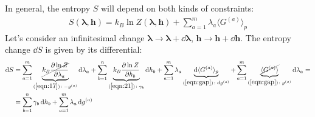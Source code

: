 \documentclass[../../main.tex]{subfiles}
\begin{document}
\begin{comment}
Besides the Lagrange multipliers $\bm{\lambda}$ associated with the constraints (also called \textit{soft constraints}), we can have other (\textit{hard}) constraints, given for example by conservation laws. For instance, variables such as the volume $V$, the number of particles $N$, the magnetization $\bm{M}$, etc. may be \textbf{fixed}. We denote them with a vector $\bm{h}$, and so $S$ depends both on $\bm{\lambda}$ and $\bm{h}$.

Macroscopically, $\bm{\lambda}$ are the conjugate variables of quantities $G^{(a)}$ (\ref{eqn:13a}) that are fixed \textit{on average} (\textbf{first class}), where the $\bm{h}$ correspond to variables that are kept constant \textit{at all times} (\textbf{second class}), which are:
\begin{align} %
    \gamma_b \equiv k_B \pdv{\ln Z}{h^{(b)}}
\end{align} 

In the next section we will consider three examples corresponding to the variables $H$, $N$ and $V$.
\begin{itemize}
    \item \textbf{Microcanonical} ensemble: no variables in the first class, i.e. no constraints of the form (\ref{eqn:13a}). $H, V, N$ belong to the second class.
    \item \textbf{Canonical} ensemble: $G^{(1)} = H$ in the first class, $N$ and $V$ in the second class.
    \item \textbf{Grandcanonical} ensemble: $G^{(1)} = H$ and $G^{(2)} = N$ in the first class, $V$ in the second  
\end{itemize}
\end{comment}

In general, the entropy $S$ will depend on both kinds of constraints:
\begin{align}\label{eqn:22}
    S(\bm{\lambda}, \bm{h}) = k_B \ln Z(\bm{\lambda}, \bm{h}) + \sum_{a=1}^m \lambda_a \langle G^{(a)} \rangle_p
\end{align}
Let's consider an infinitesimal change $\bm{\lambda} \to \bm{\lambda} +\dd{\bm{\lambda}}$, $\bm{h} \to \bm{h} + \dd{\bm{h}}$. The entropy change $\dd{S}$ is given by its differential:
\begin{align}\label{eqn:23}
    \dd{S} &= \sum_{a=1}^m \underbrace{\cancel{k_B \pdv{\ln Z}{\lambda_a}}}_{(\ref{eqn:17})\colon -g^{(a)}} \dd{\lambda_a} + \sum_{b=1}^n \underbrace{k_B \pdv{\ln Z}{h_b}}_{(\ref{eqn:21})\colon \gamma_b} \dd{h_b} + \sum_{a=1}^m \lambda_a \underbrace{\dd{\langle G^{(a)} \rangle_p}}_{(\ref{eqn:gap}) \colon \dd{g^{(a)}}} + \sum_{a=1}^m \underbrace{\cancel{\langle G^{(a)} \rangle}}_{(\ref{eqn:gap})\colon g^{(a)}}\dd{\lambda_a} =\\ \nonumber
    &= \sum_{b=1}^n \gamma_b \dd{h_b} + \sum_{a=1}^m \lambda_a \dd{g^{(a)}}
\end{align}
\end{document}
